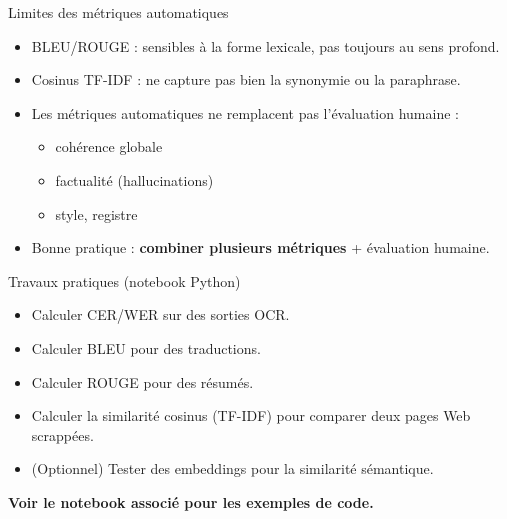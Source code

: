 \documentclass[10pt]{beamer}
\begin{document}
\begin{frame}{Limites des métriques automatiques}
  \begin{itemize}
    \item BLEU/ROUGE : sensibles à la forme lexicale, pas toujours au sens profond.
    \item Cosinus TF-IDF : ne capture pas bien la synonymie ou la paraphrase.
    \item Les métriques automatiques ne remplacent pas l'évaluation humaine :
      \begin{itemize}
        \item cohérence globale
        \item factualité (hallucinations)
        \item style, registre
      \end{itemize}
    \item Bonne pratique : \textbf{combiner plusieurs métriques} + évaluation humaine.
  \end{itemize}
\end{frame}

\begin{frame}{Travaux pratiques (notebook Python)}
  \begin{itemize}
    \item Calculer CER/WER sur des sorties OCR.
    \item Calculer BLEU pour des traductions.
    \item Calculer ROUGE pour des résumés.
    \item Calculer la similarité cosinus (TF-IDF) pour comparer deux pages Web scrappées.
    \item (Optionnel) Tester des embeddings pour la similarité sémantique.
  \end{itemize}

  \vspace{0.3cm}
  \centering
  \textbf{Voir le notebook associé pour les exemples de code.}
\end{frame}
\end{document}
